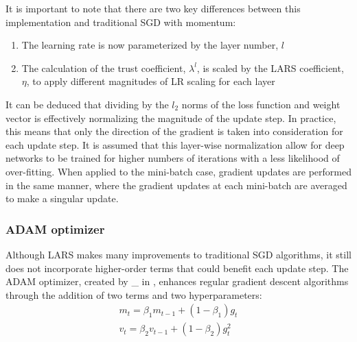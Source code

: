 
It is important to note that there are two key differences between this implementation and traditional SGD with momentum:
\begin{enumerate}
    \item The learning rate is now parameterized by the layer number, $l$
    \item The calculation of the trust coefficient, $\lambda^l$, is scaled by the LARS coefficient, $\eta$, to apply different magnitudes of LR scaling for each layer
\end{enumerate}
\vspace{4pt}

It can be deduced that dividing by the $l_2$ norms of the loss function and weight vector is effectively normalizing the magnitude of the update step. In practice, this means that only the direction of the gradient is taken into consideration for each update step. It is assumed that this layer-wise normalization allow for deep networks to be trained for higher numbers of iterations with a less likelihood of over-fitting. When applied to the mini-batch case, gradient updates are performed in the same manner, where the gradient updates at each mini-batch are averaged to make a singular update. 

\subsubsection{ADAM optimizer}
Although LARS makes many improvements to traditional SGD algorithms, it still does not incorporate higher-order terms that could benefit each update step. The ADAM optimizer, created by \_ in \cite{adam}, enhances regular gradient descent algorithms through the addition of two terms and two hyperparameters:
\vspace{-10pt}
\begin{align*}
m_{t} = \beta_{1}m_{t-1}+(1-\beta_{1})g_{t} \\
v_{t} = \beta_{2}v_{t-1}+(1-\beta_{2})g_{t}^2
\end{align*}

